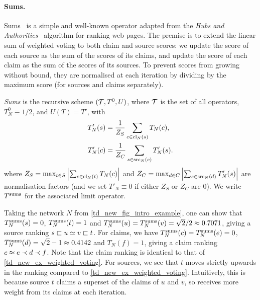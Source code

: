 \paragraph{Sums.}

Sums~\cite{pasternack2010} is a simple and well-known operator adapted from the
\emph{Hubs and Authorities}~\cite{kleinberg1999} algorithm for ranking web
pages. The premise is to extend the linear sum of weighted voting to both claim
and source scores: we update the score of each source as the sum of the scores
of its claims, and update the score of each claim as the sum of the scores of
its sources. To prevent scores from growing without bound, they are normalised
at each iteration by dividing by the maximum score (for sources and claims
separately).

\begin{definition}
    \emph{Sums} is the recursive scheme $(\mathcal{T}, T^0, U)$, where $\mathcal{T}$ is the set
    of all operators, $T^0_N \equiv 1 / 2$, and $U(T) = T'$, with
    \begin{align*}
        T'_N(s) &=
            \frac{1}{Z_S}
            \sum_{c \in \operatorname{cl}_N(s)}{
                T_N(c)
            },
        \\
        T'_N(c) &=
            \frac{1}{Z_C}
            \sum_{s \in \operatorname{src}_N(c)}{
                T'_N(s)
            }.
    \end{align*}
    where $
        Z_S = \max_{t \in S}{
            \left|
                \sum_{c \in \operatorname{cl}_N(t)}{
                    T_N(c)
                }
            \right|
        }
    $ and $
        Z_C = \max_{d \in C}{
            \left|
                \sum_{s \in \operatorname{src}_N(d)}{
                    T'_N(s)
                }
            \right|
        }
    $ are normalisation factors (and we set $T'_N \equiv 0$ if either $Z_S$ or
    $Z_C$ are 0). We write $T^{\operatorname{sums}}$ for the associated limit operator.
\end{definition}

Taking the network $N$ from \cref{td_new_fig_intro_example}, one can show that
$T^{\operatorname{sums}}_N(s) = 0$, $T^{\operatorname{sums}}_N(t) = 1$ and $T^{\operatorname{sums}}_N(u) = T^{\operatorname{sums}}_N(v) = \sqrt{2} / 2
\approx 0.7071$, giving a source ranking $s \sqsubset u \simeq v \sqsubset t$.  For claims,
we have $T^{\operatorname{sums}}_N(c) = T^{\operatorname{sums}}_N(e) = 0$, $T^{\operatorname{sums}}_N(d) = \sqrt{2} - 1 \approx
0.4142$ and $T_N(f) = 1$, giving a claim ranking $c \approx e \prec d \prec f$. Note
that the claim ranking is identical to that of
\cref{td_new_ex_weighted_voting}. For sources, we see that $t$ moves strictly
upwards in the ranking compared to \cref{td_new_ex_weighted_voting}.
Intuitively, this is because source $t$ claims a superset of the claims of $u$
and $v$, so receives more weight from its claims at each iteration.

